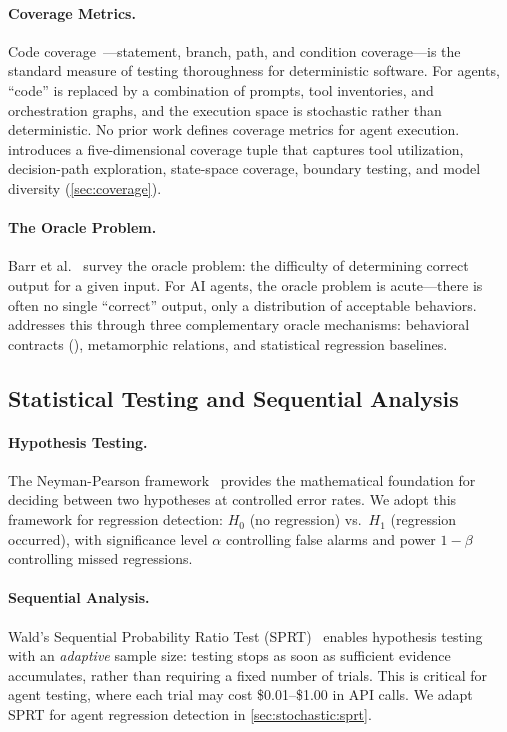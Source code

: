 \paragraph{Coverage Metrics.}
Code coverage~\citep{zhu1997software}---statement, branch, path, and
condition coverage---is the standard measure of testing thoroughness for
deterministic software. For agents, ``code'' is replaced by a
combination of prompts, tool inventories, and orchestration graphs, and
the execution space is stochastic rather than deterministic. No prior
work defines coverage metrics for agent execution. \agentassay{}
introduces a five-dimensional coverage tuple that captures tool
utilization, decision-path exploration, state-space coverage, boundary
testing, and model diversity (\cref{sec:coverage}).

\paragraph{The Oracle Problem.}
Barr et al.~\citep{barr2015oracle} survey the oracle problem: the
difficulty of determining correct output for a given input. For AI
agents, the oracle problem is acute---there is often no single ``correct''
output, only a distribution of acceptable behaviors. \agentassay{}
addresses this through three complementary oracle mechanisms: behavioral
contracts (\agentassert{}), metamorphic relations, and statistical
regression baselines.

\subsection{Statistical Testing and Sequential Analysis}
\label{sec:related:statistics}

\paragraph{Hypothesis Testing.}
The Neyman-Pearson framework~\citep{neyman1933problem,lehmann2005testing}
provides the mathematical foundation for deciding between two hypotheses
at controlled error rates. We adopt this framework for regression
detection: $H_0$ (no regression) vs.\ $H_1$ (regression occurred), with
significance level $\alpha$ controlling false alarms and power $1-\beta$
controlling missed regressions.

\paragraph{Sequential Analysis.}
Wald's Sequential Probability Ratio Test
(SPRT)~\citep{wald1947sequential} enables hypothesis testing with an
\emph{adaptive} sample size: testing stops as soon as sufficient evidence
accumulates, rather than requiring a fixed number of trials. This is
critical for agent testing, where each trial may cost \$0.01--\$1.00 in
API calls. We adapt SPRT for agent regression detection in
\cref{sec:stochastic:sprt}.

